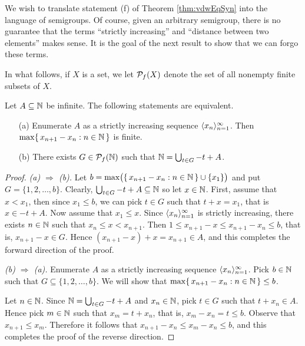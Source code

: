 We wish to translate statement (f) of Theorem \ref{thm:vdwEqSyn} into the language of semigroups.
Of course, given an arbitrary semigroup, there is no guarantee that the terms ``strictly increasing'' and ``distance between two elements'' makes sense.
It is the goal of the next result to show that we can forgo these terms.

In what follows, if $X$ is a set, we let $\mathcal{P}_f(X)$ denote the set of all nonempty finite subsets of $X$. 

\begin{prop}
  \label{prop:syn}
  Let $A \subseteq \mathbb{N}$ be infinite.
  The following statements are equivalent.
  \begin{itemize}
    \item[(a)] Enumerate $A$ as a strictly increasing sequence $\langle x_n \rangle_{n=1}^\infty$.
      Then $\max\{\, x_{n+1} - x_n : n \in \mathbb{N} \,\}$ is finite.

    \item[(b)] There exists $G \in \mathcal{P}_f(\mathbb{N})$ such that $\mathbb{N} = \bigcup_{t \in G} -t + A$. 
  \end{itemize}
\end{prop}
\begin{proof}
  \textsl{(a) $\Rightarrow$ (b).}
  Let $b = \max\bigl(\{\, x_{n+1} - x_n : n \in \mathbb{N} \,\} \cup \{x_1\}\bigr)$ and put $G = \{1, 2, \ldots, b\}$. 
  Clearly, $\bigcup_{t \in G} -t + A \subseteq \mathbb{N}$ so let $x \in \mathbb{N}$. 
  First, assume that $x < x_1$, then since $x_1 \le b$, we can pick $t \in G$ such that $t + x = x_1$, that is $x \in -t + A$.
  Now assume that $x_1 \le x$.
  Since $\langle x_n \rangle_{n=1}^\infty$ is strictly increasing, there exists $n \in \mathbb{N}$ such that $x_n \le x < x_{n+1}$.  
  Then $1 \le x_{n+1} - x \le x_{n+1} - x_n \le b$, that is, $x_{n+1} - x \in G$.
  Hence $(x_{n+1} - x) + x = x_{n+1} \in A$, and this completes the forward direction of the proof.

  \textsl{(b) $\Rightarrow$ (a).}
  Enumerate $A$ as a strictly increasing sequence $\langle x_n \rangle_{n=1}^\infty$. 
  Pick $b \in \mathbb{N}$ such that $G \subseteq \{1, 2, \ldots, b\}$.
  We will show that $\max\{\, x_{n+1} - x_n : n \in \mathbb{N} \,\} \le b$. 

  Let $n \in \mathbb{N}$.
  Since $\mathbb{N} = \bigcup_{t \in G} -t+A$ and $x_n \in \mathbb{N}$, pick $t \in G$ such that $t + x_n \in A$.
  Hence pick $m \in \mathbb{N}$ such that $x_m = t + x_n$, that is, $x_m - x_n = t \le b$. 
  Observe that $x_{n+1} \le x_m$.
  Therefore it follows that $x_{n+1} - x_n \le x_m - x_n \le b$, and this completes the proof of the reverse direction.
\end{proof}

